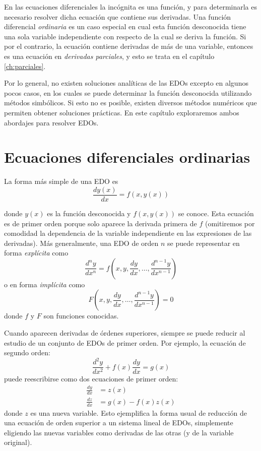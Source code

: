En las ecuaciones diferenciales la incógnita es una función, y para determinarla es necesario resolver dicha ecuación que contiene sus derivadas. Una función diferencial \textit{ordinaria} es un caso especial en cual esta función desconocida tiene una sola variable independiente con respecto de la cual se deriva la función. Si por el contrario, la ecuación contiene derivadas de más de una variable, entonces es una ecuación en \textit{derivadas parciales}, y esto se trata en el capítulo \ref{ch:parciales}.

Por lo general, no existen soluciones analíticas de las EDOs excepto en algunos pocos casos, en los cuales se puede determinar la función desconocida utilizando métodos simbólicos. Si esto no es posible, existen diversos métodos numéricos que permiten obtener soluciones prácticas. En este capítulo exploraremos ambos abordajes para resolver EDOs.

\section{Ecuaciones diferenciales ordinarias}

La forma más simple de una EDO es 
\begin{equation}
 \frac{dy(x)}{dx} = f(x, y(x))
\end{equation}

donde $y(x)$ es la función desconocida y $f(x, y(x))$ se conoce. Esta ecuación es de primer orden porque solo aparece la derivada primera de $f$ (omitiremos por comodidad la dependencia de la variable independiente en las expresiones de las derivadas).  Más generalmente, una EDO de orden $n$ se puede representar en forma \textit{explícita} como
\begin{equation}
 \frac{d^ny}{dx^n} = f \left( x, y, \frac{dy}{dx}, \ldots, \frac{d^{n-1}y}{dx^{n-1}} \right)
\end{equation} 
o en forma \textit{implícita} como
\begin{equation}
 F \left( x, y, \frac{dy}{dx}, \ldots, \frac{d^{n-1}y}{dx^{n-1}} \right) = 0
\end{equation} 
donde $f$ y $F$ son funciones conocidas.

Cuando aparecen derivadas de órdenes superiores, siempre se puede  reducir al estudio de un conjunto de EDOs de primer orden. Por ejemplo, la ecuación de segundo orden:
\begin{equation}
 \frac{d^2y}{dx^2}+f(x) \frac{dy}{dx} = g(x)
\end{equation}
puede reescribirse como dos ecuaciones de primer orden:
\begin{align}
 \frac{dy}{dx} &= z(x) \\
 \frac{dz}{dx} &= g(x) - f(x)z(x)
\end{align}
donde $z$ es una nueva variable. Esto ejemplifica la forma usual de reducción de una ecuación de orden superior a un sistema lineal de EDOs, simplemente eligiendo las nuevas variables como derivadas de las otras (y de la variable original).

